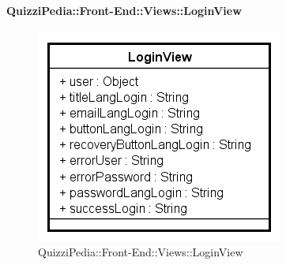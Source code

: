 \paragraph{QuizziPedia::Front-End::Views::LoginView}

\label{QuizziPedia::Front-End::View::LoginView}
\begin{figure} [ht]
	\centering
	\includegraphics[scale=0.80]{UML/Classi/Front-End/QuizziPedia_Front-end_Views_LoginView.png}
	\caption{QuizziPedia::Front-End::Views::LoginView}
\end{figure} \FloatBarrier
